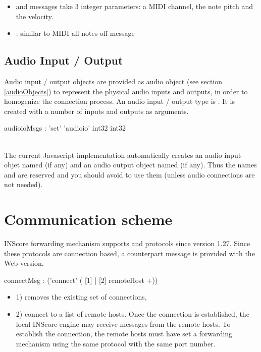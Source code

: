 \documentclass[a4paper,twoside]{article}
\newcommand{\toplevel}[1]	{\section{#1}}
\newcommand{\sublevel}[1]	{\subsection{#1}}
\begin{document}
\begin{itemize}
\item {} and  messages take 3 integer parameters: a MIDI channel, the note pitch and the velocity.
\item {}: similar to MIDI all notes off message
\end{itemize}

\sublevel{Audio Input / Output}
\label{audioioObjects}

Audio input / output objects are provided as audio object (see section \ref{audioObjects}) to represent the physical audio inputs and outputs, in order to homogenize the connection process.
An audio input / output type is . It is created with a number of inputs and outputs as arguments.

\begin{rail}
audioioMsgs : 'set' 'audioio' int32 int32
\end{rail}

\note\\
The current Javascript implementation automatically creates an audio input objet named  (if any) and an audio output object named   (if any). Thus the names  and  are reserved and you should avoid to use them (unless audio connections are not needed).
 

\toplevel{Communication scheme}
\label{communication}

INScore forwarding mechanism supports  and  protocols since version 1.27. Since these protocols are connection based, a counterpart  message is provided with the Web version.

\begin{rail}
connectMsg : ('connect' ( [1] | [2] remoteHost +))
\end{rail}

\begin{itemize}
\item 1) removes the existing set of connections,
\item 2) connect to a list of remote hosts. Once the connection is established, the local INScore engine may receive messages from the remote hosts. To establish the connection, the remote hosts must have set a forwarding mechanism using the same protocol with the same port number. 
\end{itemize}
\end{document}
